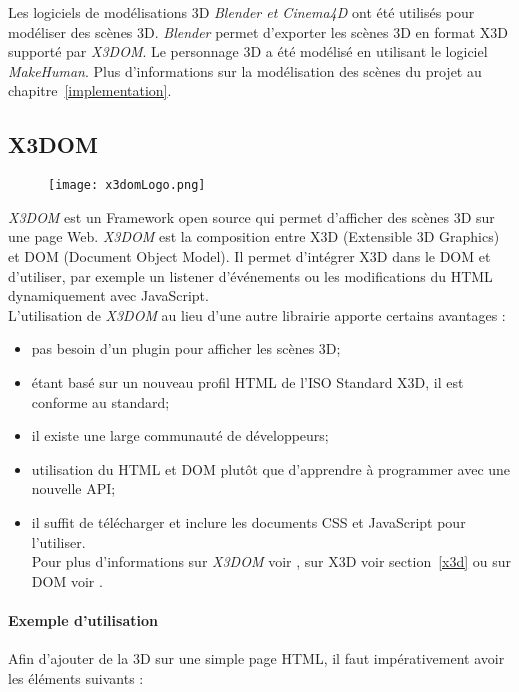 Les logiciels de modélisations 3D \textit{Blender et Cinema4D} ont été utilisés pour modéliser des scènes 3D. \textit{Blender} permet d'exporter les scènes 3D en format X3D supporté par \textit{X3DOM}. Le personnage 3D a été modélisé en utilisant le logiciel \textit{MakeHuman}. Plus d'informations sur la modélisation des scènes du projet au chapitre~\ref{implementation}.

\subsection{X3DOM}  \label{x3dom}
\begin{figure}[H]
\flushright
   \texttt{[image: x3domLogo.png]}
\end{figure}

\textit{X3DOM} est un \textsf{Framework} open source qui permet d'afficher des scènes 3D sur une page Web. \textit{X3DOM} est la composition entre \textsf{X3D} (Extensible 3D Graphics) et \textsf{DOM} (Document Object Model). Il permet d'intégrer X3D dans le DOM et d'utiliser, par exemple un listener d'événements ou les modifications du HTML dynamiquement avec \textsf{JavaScript}. \\

L'utilisation de \textit{X3DOM} au lieu d'une autre librairie apporte certains avantages :
\begin{itemize}
\item pas besoin d'un plugin pour afficher les scènes 3D;
\item étant basé sur un nouveau profil HTML de l'ISO Standard X3D, il est conforme au standard;
\item il existe une large communauté de développeurs;
\item utilisation du HTML et DOM plutôt que d'apprendre à programmer avec une nouvelle API;
\item il suffit de télécharger et inclure les documents CSS et \textsf{JavaScript} pour l'utiliser.\\
Pour plus d'informations sur \textit{X3DOM} voir \cite{X3DOM}, sur X3D voir section~\ref{x3d} ou sur DOM voir \cite{DOM}.

\end{itemize}

\paragraph{Exemple d'utilisation \\ }
Afin d'ajouter de la 3D sur une simple page HTML, il faut impérativement avoir les éléments suivants : 


